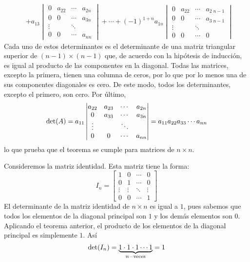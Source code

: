\begin{theorem}
\begin{align*}
        & + a_{13} \begin{vmatrix}
            0 & a_{22} & \cdots & a_{2n} \\
            0 & 0 & \cdots & a_{3n} \\
            \vdots & & \ddots & \\
            0 & 0 & \cdots & a_{nn}
        \end{vmatrix} + \cdots + (-1)^{1+n} a_{1n} \begin{vmatrix}
            0 & a_{22} & \cdots & a_{2 \; n-1} \\
            0 & 0 & \cdots & a_{3 \; n-1} \\
            \vdots & & \ddots & \\
            0 & 0 & \cdots & 0
        \end{vmatrix}
    \end{align*}
    Cada uno de estos determinantes es el determinante de una matriz triangular superior de $(n - 1) \times (n - 1)$ que, de acuerdo con la hipótesis de inducción, es igual al producto de las componentes en la diagonal. Todas las matrices, excepto la primera, tienen una columna de ceros, por lo que por lo menos una de sus componentes diagonales es cero. De este modo, todos los determinantes, excepto el primero, son cero. Por último,
    $$\operatorname{det}(A) = a_{11} \begin{vmatrix}
        a_{22} & a_{23} & \cdots & a_{2n} \\
        0 & a_{33} & \cdots & a_{3n} \\
        \vdots & & \ddots & \\
        0 & 0 & \cdots & a_{nn}
    \end{vmatrix} = a_{11}a_{22}a_{33} \cdots a_{nn}$$
    lo que prueba que el teorema se cumple para matrices de $n \times n$.
\end{theorem}

\begin{observation}
    Consideremos la matriz identidad. Esta matriz tiene la forma:
    $$I_n = \begin{bmatrix}
        1 & 0 & \cdots & 0 \\
        0 & 1 & \cdots & 0 \\
        \vdots & \vdots & \ddots & \vdots \\
        0 & 0 & \cdots & 1
    \end{bmatrix}$$
    El determinante de la matriz identidad de $n \times n$ es igual a $1$, pues sabemos que todos los elementos de la diagonal principal son $1$ y los demás elementos son $0$. Aplicando el teorema anterior, el producto de los elementos de la diagonal principal es simplemente $1$. Así
    $$\operatorname{det}(I_n) = \underbrace{1 \cdot 1 \cdot 1 \cdots 1}_{n-\text{veces}} = 1$$
\end{observation}

